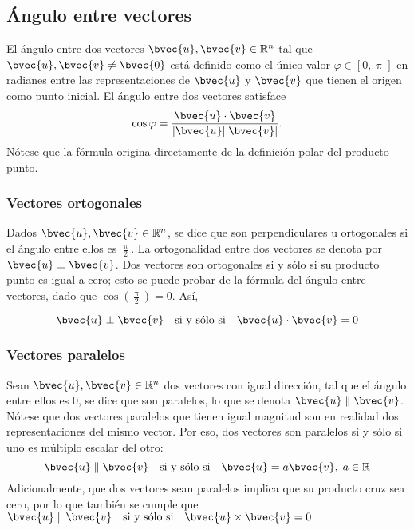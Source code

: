 \documentclass{fmbnotes}
\begin{document}
\subsection{Ángulo entre vectores}

El ángulo entre dos vectores \( \bvec{u}, \bvec{v} \in \mathbb{R}^{n} \) tal que \( \bvec{u}, \bvec{v} \neq \bvec{0} \) está definido como el único valor \( \varphi \in [0, \uppi] \) en radianes entre las representaciones de \( \bvec{u} \) y \( \bvec{v} \) que tienen el origen como punto inicial. El ángulo entre dos vectores satisface
\[ \cos \varphi=\frac{\bvec{u} \cdot \bvec{v}}{|\bvec{u}||\bvec{v}|}.\]
Nótese que la fórmula origina directamente de la definición polar del producto punto.

\subsubsection{Vectores ortogonales}

Dados \( \bvec{u}, \bvec{v} \in \mathbb{R}^{n} \), se dice que son perpendiculares u ortogonales si el ángulo entre ellos es \( \frac{\uppi}{2}  \). La ortogonalidad entre dos vectores se denota por \( \bvec{u} \perp \bvec{v} \). Dos vectores son ortogonales si y sólo si su producto punto es igual a cero; esto se puede probar de la fórmula del ángulo entre vectores, dado que \( \cos \left(\frac{\uppi}{2}\right)=0  \). Así,

\[ \bvec{u} \perp \bvec{v} \quad \text{si y sólo si} \quad  \bvec{u} \cdot \bvec{v}=0 \]

\subsubsection{Vectores paralelos}

Sean \( \bvec{u}, \bvec{v} \in \mathbb{R}^{n} \) dos vectores con igual dirección, tal que el ángulo entre ellos es \( 0 \), se dice que son paralelos, lo que se denota \( \bvec{u} \parallel \bvec{v} \). Nótese que dos vectores paralelos que tienen igual magnitud son en realidad dos representaciones del mismo vector. Por eso, dos vectores son paralelos si y sólo si uno es múltiplo escalar del otro:
\[ \bvec{u} \parallel \bvec{v} \quad \text{si y sólo si} \quad  \bvec{u}=a \bvec{v}, \; a \in \mathbb{R} \]
Adicionalmente, que dos vectores sean paralelos implica que su producto cruz sea cero, por lo que también se cumple que \(\bvec{u} \parallel \bvec{v} \quad \text{si y sólo si} \quad  \bvec{u} \times \bvec{v}=0 \)
\end{document}
